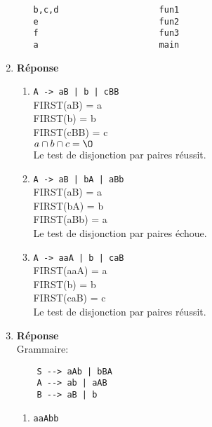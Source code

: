 \documentclass[12pt]{book}
\begin{document}
\begin{enumerate}
\begin{enumerate}
\begin{verbatim}
b,c,d                    fun1
e                        fun2
f                        fun3
a                        main
\end{verbatim}
    \end{enumerate}

\newpage    

    \item \textbf{Réponse}
    \begin{enumerate}
        \item \texttt{A -> aB | b | cBB}\\
        
        FIRST(aB) = a\\
        FIRST(b) = b\\
        FIRST(cBB) = c\\
        
        $a \cap b \cap c = \O$\\
        
        Le test de disjonction par paires réussit.
        
        \item \texttt{A -> aB | bA | aBb}\\
        
        FIRST(aB) = a\\
        FIRST(bA) = b\\
        FIRST(aBb) = a\\
        
        Le test de disjonction par paires échoue.
        
        \item \texttt{A -> aaA | b | caB}\\
        
        FIRST(aaA) = a\\
        FIRST(b) = b\\
        FIRST(caB) = c\\
        
        Le test de disjonction par paires réussit.
    \end{enumerate}
    
    \item \textbf{Réponse}\\
    
    Grammaire:
\begin{verbatim}
    S --> aAb | bBA
    A --> ab | aAB
    B --> aB | b
\end{verbatim}
        \begin{enumerate}
            \item \texttt{aaAbb}\\
            

\end{enumerate}
\end{enumerate}
\end{document}
